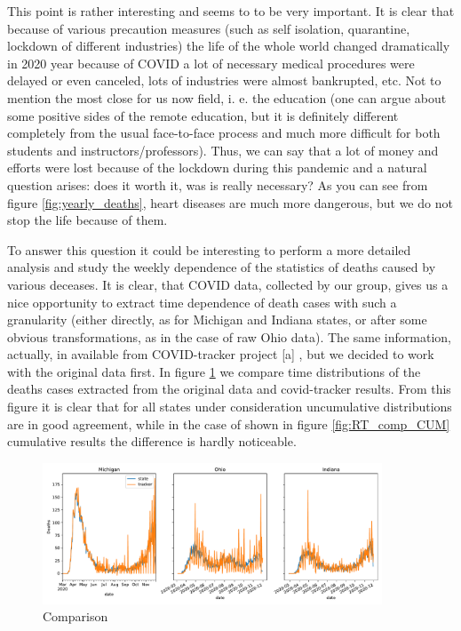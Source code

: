 \documentclass[conference]{IEEEtran}
\begin{document}
This point is rather interesting and seems to to be very  important. It is clear that because of various precaution measures (such as self isolation, quarantine, lockdown of different industries) the life of the whole world changed dramatically in 2020 year because of COVID a lot of necessary medical procedures were delayed or even canceled, lots of industries were almost bankrupted, etc. Not to mention the most close for us now field, i. e. the education (one can argue about some positive sides of the remote education, but it is definitely different completely from the usual face-to-face process and much more difficult for both students and instructors/professors). Thus, we can say that a lot of money and efforts were lost because of the lockdown during this pandemic and a natural question arises: does it worth it, was is really necessary? As you can see from figure \ref{fig:yearly_deaths}, heart diseases are much more dangerous, but we do not stop the life because of them.



To answer this question it could be interesting to perform a more detailed analysis and study the weekly dependence of the statistics of deaths caused by various deceases. It is clear, that COVID data, collected by our group, gives us a nice opportunity to extract time dependence of death cases with such a granularity (either directly, as for Michigan and Indiana states, or after some obvious transformations, as in the case of raw Ohio data). The same information, actually, in available from COVID-tracker project [a] , but we decided to work with the original data first. In figure \ref{fig:RT_comp_NC} we compare time distributions of the deaths cases extracted from the original data and covid-tracker results. From this figure it is clear that for all states under consideration uncumulative distributions are in good agreement, while in the case of shown in figure \ref{fig:RT_comp_CUM} cumulative results the difference is hardly noticeable.

\begin{figure}
  \centering
  \includegraphics[width=0.9\textwidth]{figs/raw_tracker_comp_nc}
  \caption{Comparison}
  \label{fig:RT_comp_NC}
\end{figure}
\end{document}
